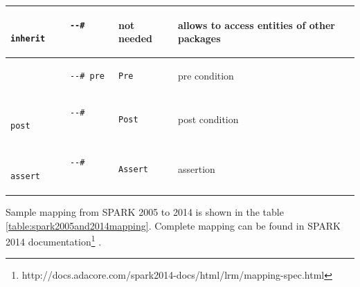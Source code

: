 \begin{center}
\begin{longtable}{| p{1.5in} | p{1.5in} | p{3in} |}
		\\ \hline

		\begin{lstlisting}
			--# inherit
		\end{lstlisting} 
		& 
		not needed
		& 
		allows to access entities of other packages

		\\ \hline

		\begin{lstlisting}
			--# pre
		\end{lstlisting} 
		& 
		\begin{lstlisting}[language=ada2012]
			Pre
		\end{lstlisting} 
		& 
		pre condition

		\\ \hline
		

		\begin{lstlisting}
			--# post
		\end{lstlisting} 
		& 
		\begin{lstlisting}[language=ada2012]
			Post
		\end{lstlisting} 
		& 
		post condition

		\\ \hline
		

		\begin{lstlisting}
			--# assert
		\end{lstlisting} 
		& 
		\begin{lstlisting}[language=ada2012]
			Assert
		\end{lstlisting} 
		& 
		assertion

		\\ \hline
	\end{longtable}
\end{center}
\doublespacing

Sample mapping from SPARK 2005 to 2014 is shown in the table \ref{table:spark2005and2014mapping}. Complete mapping can be found in SPARK 2014 documentation\footnote{http://docs.adacore.com/spark2014-docs/html/lrm/mapping-spec.html} \cite{Spark2014refManual:Online}.


